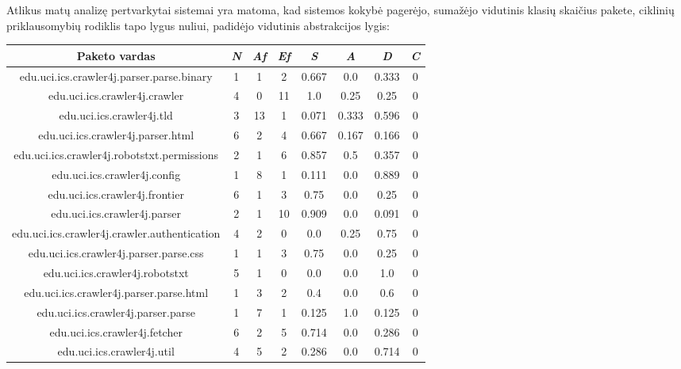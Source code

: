 Atlikus matų analizę pertvarkytai sistemai yra matoma, kad sistemos kokybė pagerėjo,
sumažėjo vidutinis klasių skaičius pakete, ciklinių priklausomybių rodiklis tapo lygus nuliui,
padidėjo vidutinis abstrakcijos lygis:
\begin{center}
    \begin{tabular}{|c|c|c|c|c|c|c|c|}
        \hline
        Paketo vardas & \textit{N} & \textit{Af} & \textit{Ef} & \textit{S} & \textit{A} & \textit{D} & \textit{C} \\ [0.5ex]
        \hline\hline
        edu.uci.ics.crawler4j.parser.parse.binary & 1 & 1 & 2 & 0.667 & 0.0 & 0.333 & 0 \\
        \hline
        edu.uci.ics.crawler4j.crawler & 4 & 0 & 11 & 1.0 & 0.25 & 0.25 & 0 \\
        \hline
        edu.uci.ics.crawler4j.tld & 3 & 13 & 1 & 0.071 & 0.333 & 0.596 & 0 \\
        \hline
        edu.uci.ics.crawler4j.parser.html & 6 & 2 & 4 & 0.667 & 0.167 & 0.166 & 0 \\
        \hline
        edu.uci.ics.crawler4j.robotstxt.permissions & 2 & 1 & 6 & 0.857 & 0.5 & 0.357 & 0 \\
        \hline
        edu.uci.ics.crawler4j.config & 1 & 8 & 1 & 0.111 & 0.0 & 0.889 & 0 \\
        \hline
        edu.uci.ics.crawler4j.frontier & 6 & 1 & 3 & 0.75 & 0.0 & 0.25 & 0 \\
        \hline
        edu.uci.ics.crawler4j.parser & 2 & 1 & 10 & 0.909 & 0.0 & 0.091 & 0\\
        \hline
        edu.uci.ics.crawler4j.crawler.authentication & 4 & 2 & 0 & 0.0 & 0.25 & 0.75 & 0 \\
        \hline
        edu.uci.ics.crawler4j.parser.parse.css & 1 & 1 & 3 & 0.75 & 0.0 & 0.25 & 0 \\
        \hline
        edu.uci.ics.crawler4j.robotstxt & 5 & 1 & 0 & 0.0 & 0.0 & 1.0 & 0 \\
        \hline
        edu.uci.ics.crawler4j.parser.parse.html & 1 & 3 & 2 & 0.4 & 0.0 & 0.6 & 0 \\
        \hline
        edu.uci.ics.crawler4j.parser.parse & 1 & 7 & 1 & 0.125 & 1.0 & 0.125 & 0\\
        \hline
        edu.uci.ics.crawler4j.fetcher & 6 & 2 & 5 & 0.714 & 0.0 & 0.286 & 0 \\
        \hline
        edu.uci.ics.crawler4j.util & 4 & 5 & 2 & 0.286 & 0.0 & 0.714 & 0 \\

\end{tabular}
\end{center}
